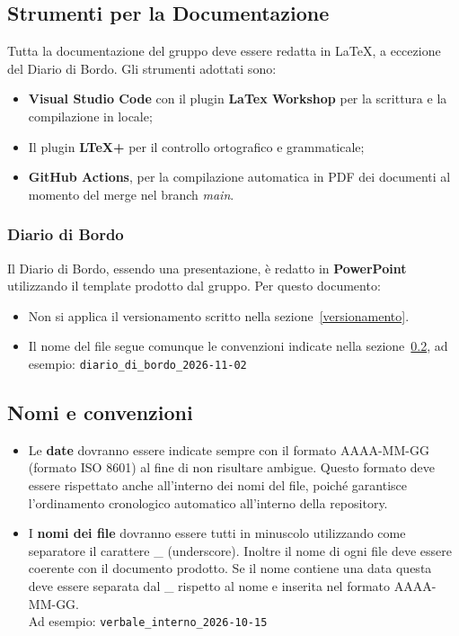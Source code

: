 \subsection{Strumenti per la Documentazione}
Tutta la documentazione del gruppo deve essere redatta in {\LaTeX}, a eccezione del Diario di Bordo. Gli strumenti adottati sono:
\begin{itemize}
	\item \textbf{Visual Studio Code} con il plugin \textbf{LaTex Workshop} per la scrittura e la compilazione in locale;
	\item Il plugin \textbf{LTeX+} per il controllo ortografico e grammaticale;
	\item \textbf{GitHub Actions}, per la compilazione automatica in PDF dei documenti al momento del merge nel branch \textit{main}.
\end{itemize}

\subsubsection{Diario di Bordo}
Il Diario di Bordo, essendo una presentazione, è redatto in \textbf{PowerPoint} utilizzando il template prodotto dal gruppo. Per questo documento:
\begin{itemize}
	\item Non si applica il versionamento scritto nella sezione~\ref{versionamento}.
	\item Il nome del file segue comunque le convenzioni indicate nella sezione~\ref{nomi}, ad esempio: \texttt{diario\_di\_bordo\_2026-11-02}
\end{itemize}

\subsection{Nomi e convenzioni}
\label{nomi}
\begin{itemize}
	\item Le \textbf{date} dovranno essere indicate sempre con il formato AAAA-MM-GG (formato ISO 8601) al fine di non risultare ambigue. Questo formato deve essere rispettato anche all'interno dei nomi del file, poiché garantisce l'ordinamento cronologico automatico all'interno della repository.
	\item I \textbf{nomi dei file} dovranno essere tutti in minuscolo utilizzando come separatore il carattere \_ (underscore). Inoltre il nome di ogni file deve essere coerente con il documento prodotto. Se il nome contiene una data questa deve essere separata dal \_ rispetto al nome e inserita nel formato AAAA-MM-GG. \\
	Ad esempio: \texttt{verbale\_interno\_2026-10-15}
\end{itemize}

